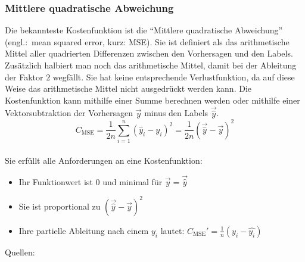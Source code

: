 \subsubsection{Mittlere quadratische Abweichung}
Die bekannteste Kostenfunktion ist die ``Mittlere quadratische Abweichung''
(engl.:\ mean squared error, kurz: MSE). Sie ist definiert als das arithmetische Mittel
aller quadrierten Differenzen zwischen den Vorhersagen und den Labels.
Zusätzlich halbiert man noch das arithmetische Mittel, damit bei der Ableitung der Faktor
$2$ wegfällt. Sie hat keine entsprechende Verlustfunktion, da auf diese Weise das
arithmetische Mittel nicht ausgedrückt werden kann.
Die Kostenfunktion kann mithilfe einer Summe berechnen werden oder mithilfe
einer Vektorsubtraktion der Vorhersagen $\vec{y}$ minus den Labels
$\vec{\hat{y}}$.
\\
\begin{equation}\label{eq:MSE}
  C_{\text{MSE}} = \frac{1}{2n}\sum_{i=1}^{n}{(\hat{y}_i - y_i)}^2 = \frac{1}{2n}{(\vec{\hat{y}} - \vec{y})}^2
\end{equation}
\\
Sie erfüllt alle Anforderungen an eine Kostenfunktion:
\begin{itemize}
\item{Ihr Funktionwert ist 0 und minimal für $\vec{y} = \vec{\hat{y}}$}
\item{Sie ist proportional zu ${(\vec{\hat{y}}-\vec{y})}^2$}
\item{Ihre partielle Ableitung nach einem $y_i$ lautet: $C_{\text{MSE}}'=\frac{1}{n}(y_i-\hat{y_i})$}
\end{itemize}
\para{}
Quellen: \cite{Nielsen}

